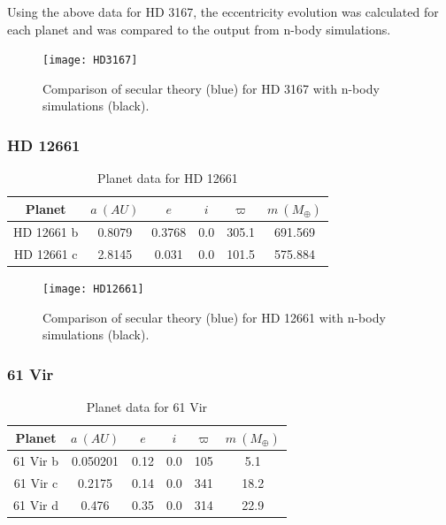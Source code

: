 \documentclass[11pt, oneside]{article}   	%
\begin{document}
Using the above data for HD 3167, the eccentricity evolution was calculated for each planet and was compared to the output from n-body simulations.

\begin{figure}[!h]
\begin{center}
\texttt{[image: HD3167]}
\caption[]{Comparison of secular theory (blue) for HD 3167 with n-body simulations (black).}
\label{}
\end{center}
\end{figure}

\newpage

\subsubsection{HD 12661}

\begin{table}[!h]
\centering
\small
\label{my-label}
\begin{tabular}{|c|c|c|c|c|c|}
\hline
\rowcolor[HTML]{C0C0C0} 
Planet & $a \ (AU)$       & $e$     & $i$   & $\varpi$  & $m \ (M _{\oplus})$ \\ \hline
HD 12661 b    & 0.8079 & 0.3768 & 0.0 & 305.1 & 691.569 \\ \hline
HD 12661 c    & 2.8145 & 0.031  & 0.0 & 101.5 & 575.884 \\ \hline
\end{tabular}
\caption{Planet data for HD 12661}
\end{table}




\begin{figure}[!h]
\begin{center}
\texttt{[image: HD12661]}
\caption[]{Comparison of secular theory (blue) for HD 12661 with n-body simulations (black).}
\label{}
\end{center}
\end{figure}

\newpage

\subsubsection{61 Vir}

\begin{table}[!h]
\centering
\small
\label{my-label}
\begin{tabular}{|c|c|c|c|c|c|}
\hline
\rowcolor[HTML]{C0C0C0} 
Planet & $a \ (AU)$       & $e$     & $i$   & $\varpi$  & $m \ (M _{\oplus})$ \\ \hline
61 Vir b    & 0.050201 & 0.12 & 0.0 & 105 & 5.1  \\ \hline
61 Vir c    & 0.2175   & 0.14 & 0.0 & 341 & 18.2 \\ \hline
61 Vir d    & 0.476    & 0.35 & 0.0 & 314 & 22.9 \\ \hline
\end{tabular}
\caption{Planet data for 61 Vir}
\end{table}
\end{document}
